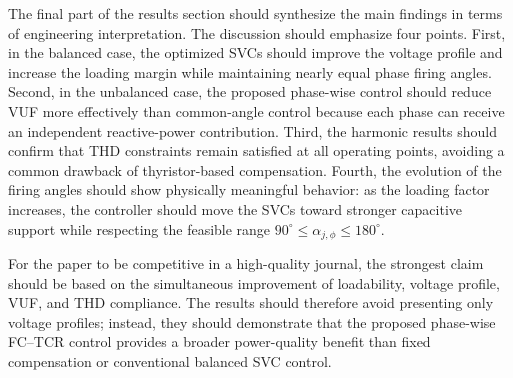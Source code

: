 The final part of the results section should synthesize the main findings in
terms of engineering interpretation. The discussion should emphasize four
points. First, in the balanced case, the optimized SVCs should improve the
voltage profile and increase the loading margin while maintaining nearly
equal phase firing angles. Second, in the unbalanced case, the proposed
phase-wise control should reduce VUF more effectively than common-angle
control because each phase can receive an independent reactive-power
contribution. Third, the harmonic results should confirm that THD constraints
remain satisfied at all operating points, avoiding a common drawback of
thyristor-based compensation. Fourth, the evolution of the firing angles
should show physically meaningful behavior: as the loading factor increases,
the controller should move the SVCs toward stronger capacitive support while
respecting the feasible range $90^\circ \leq \alpha_{j,\phi} \leq 180^\circ$.

For the paper to be competitive in a high-quality journal, the strongest
claim should be based on the simultaneous improvement of loadability,
voltage profile, VUF, and THD compliance. The results should therefore avoid
presenting only voltage profiles; instead, they should demonstrate that the
proposed phase-wise FC--TCR control provides a broader power-quality benefit
than fixed compensation or conventional balanced SVC control.